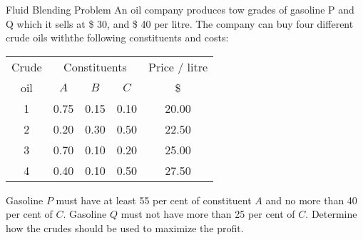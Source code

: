 \begin{frameExample}{Fluid Blending Problem}{}
  An oil company produces tow grades of gasoline P and Q which it sells at \$ 30, and \$ 40 per litre. The company can buy four different crude oils withthe following constituents and costs:

  {\centering
    \begin{tabular}{ccccc}
      \toprule
      Crude&\multicolumn{3}{c}{Constituents}& Price / litre\\
      \cmidrule{2-4}
      oil&$A$&$B$&$C$& \$ \\
      \midrule
      1&0.75&0.15&0.10 & 20.00\\
      2&0.20&0.30&0.50&22.50\\
      3&0.70&0.10&0.20&25.00\\
      4&0.40&0.10&0.50&27.50\\
      \bottomrule
    \end{tabular}
    \par}

  Gasoline $P$ must have at least 55 per cent of constituent $A$ and no more than 40 per cent of $C$. Gasoline $Q$ must not have more than 25 per cent of $C$. Determine how the crudes should be used to maximize the profit.
\end{frameExample}


